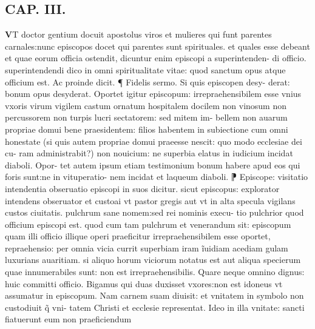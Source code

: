 \documentclass{article}
\begin{document}
\begin{pages}
\endnumbering\beginnumbering\section{CAP. III.}\pstart \huge\textbf{V}\normalsize T doctor gentium docuit apostolus viros et mulieres qui funt parentes carnales:nunc episcopos docet qui parentes sunt spirituales. et quales esse debeant et quae eorum officia ostendit, dicuntur enim episcopi a superintenden- di officio. superintendendi dico in omni spiritualitate vitae: quod sanctum opus atque officium est. Ac proinde dicit. ¶ Fidelis sermo. Si quis episcopen desy- derat: bonum opus desyderat. Oportet igitur episcopum: irrepraehensibilem esse vnius vxoris virum vigilem castum ornatum hospitalem docilem  non vinosum non percussorem non turpis lucri sectatorem: sed mitem im-  bellem non auarum propriae domui bene praesidentem: filios habentem in subiectione cum  omni honestate (si quis autem propriae domui praeesse nescit: quo modo ecclesiae dei cu-  ram administrabit?) non nouicium: ne superbia elatus in iudicium incidat diaboli. Opor-  tet autem ipsum etiam testimonium bonum habere apud eos qui foris sunt:ne in vituperatio-  nem incidat et laqueum diaboli. ⁋ Episcope: visitatio intendentia obseruatio episcopi in suos dicitur. sicut episcopus: explorator intendens obseruator et custoai vt pastor gregis aut vt in alta specula vigilans custos ciuitatis. pulchrum sane nomem:sed rei nominis execu- tio pulchrior quod officium episcopi est. quod cum tam pulchrum et venerandum sit: episcopum quam illi officio illique operi praeficitur irrepraehensibilem esse oportet, repraehensio: per omnia vicia currit superbiam iram ĩuidiam acediam gulam luxurians auaritiam. si aliquo horum viciorum notatus est aut aliqua specierum quae innumerabiles sunt: non est irrepraehensibilis. Quare neque  omnino dignus: huic committi officio. Bigamus qui duas duxisset vxores:non est idoneus  vt assumatur in episcopum. Nam carnem suam diuisit: et vnitatem in symbolo non custodiuit q̃ vni- tatem Christi et ecclesie representat. Ideo in illa vnitate: sancti fiatuerunt eum non praeficiendum  \pend

\end{pages}
\end{document}
